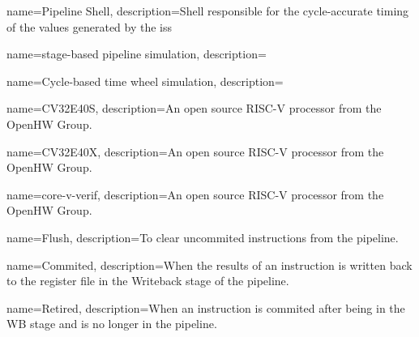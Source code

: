 

\makeglossaries %


{
    name=Pipeline Shell,
    description=Shell responsible for the cycle-accurate timing of the values generated by the \acrshort{iss}
}

{
    name=stage-based pipeline simulation,
    description=
}

{
    name=Cycle-based time wheel simulation,
    description=
}

{
    name=CV32E40S,
    description=An open source RISC-V processor from the OpenHW Group.
}

{
    name=CV32E40X,
    description=An open source RISC-V processor from the OpenHW Group.
}

{
    name=core-v-verif,
    description=An open source RISC-V processor from the OpenHW Group.
}


{
    name=Flush,
    description=To clear uncommited instructions from the pipeline. 
}

{
    name=Commited,
    description=When the results of an instruction is written back to the register file in the Writeback stage of the pipeline.
}

{
    name=Retired,
    description=When an instruction is \gls{commited} after being in the WB stage and is no longer in the pipeline.
}




